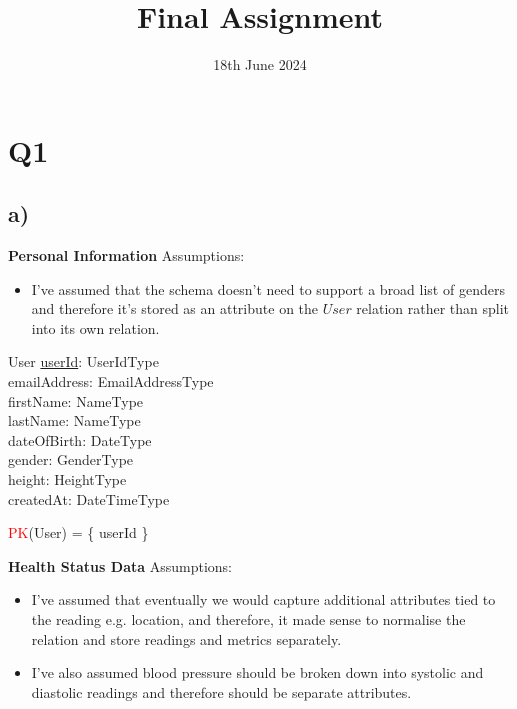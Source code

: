 \documentclass{article}
\title{Final Assignment}
\date{\vspace{-1.0cm}18th June 2024}
\begin{document}
\maketitle

\section*{Q1}

\subsection*{\small a)}
\textbf{Personal Information}
\newline \newline Assumptions:
\begin{itemize}
    \item I've assumed that the schema doesn't need to support a broad list of genders and therefore it's stored as an attribute on the $User$ relation rather than split into its own relation.
\end{itemize}
\begin{schema}{User}
	\underline{userId}: UserIdType \\
  emailAddress: EmailAddressType \\
  firstName: NameType \\
  lastName: NameType \\
  dateOfBirth: DateType \\
  gender: GenderType \\
  height: HeightType \\ 
  createdAt: DateTimeType \\
\end{schema}
\begin{zed}
\textcolor{red}{PK}(User) = \{ userId \} \\
\end{zed}
\newline
\textbf{Health Status Data}
\newline \newline Assumptions:
\begin{itemize}
  \item I've assumed that eventually we would capture additional attributes tied to the reading e.g. location, and therefore, it made sense to normalise the relation and store readings and metrics separately.
  \item I've also assumed blood pressure should be broken down into systolic and diastolic readings and therefore should be separate attributes.
\end{itemize}
\end{document}
